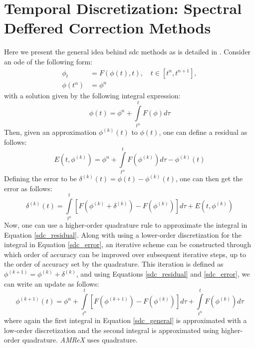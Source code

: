 \section{Temporal Discretization: Spectral Deffered Correction Methods}
Here we present the general idea behind \gls{sdc} methods as is detailed in \cite{MISDC_general}. Consider an \gls{ode} of the following form: 
\begin{equation} \label{toy_ode}
\begin{split}
\phi_t &= F(\phi(t), t), \quad t \in [t^n, t^{n+1}], \\
\phi(t^n) &= \phi^n 
\end{split}
\end{equation}
with a solution given by the following integral expression:
\begin{equation}
\phi(t) = \phi^n + \int\limits_{t^n}^{t} F(\phi) d\tau
\end{equation}
Then, given an approximation $\phi^{(k)}(t)$ to $\phi(t)$, one can define a residual as follows:
\begin{equation} \label{sdc_residual}
E(t, \phi^{(k)}) = \phi^n + \int\limits_{t^n}^t  F(\phi^{(k)}) d\tau - \phi^{(k)}(t)
\end{equation}
Defining the error to be $\delta^{(k)}(t) = \phi(t) - \phi^{(k)}(t)$, one can then get the error as follows:
\begin{equation} \label{sdc_error}
\delta^{(k)}(t) = \int\limits_{t^n}^{t} \left[ F(\phi^{(k)} + \delta^{(k)}) - F(\phi^{(k)}) \right] d\tau + E(t, \phi^{(k)})
\end{equation}
Now, one can use a higher-order quadrature rule to approximate the integral in Equation \ref{sdc_residual}. Along with using a lower-order discretization for the integral in Equation \ref{sdc_error}, an iterative scheme can be constructed through which order of accuracy can be improved over subsequent iterative steps, up to the order of accuracy set by the quadrature. This iteration is defined as $\phi^{(k+1)} = \phi^{(k)} + \delta^{(k)}$, and using Equations \ref{sdc_residual} and \ref{sdc_error}, we can write an update as follows:
\begin{equation} \label{sdc_general}
\phi^{(k+1)}(t) = \phi^n + \int\limits_{t^n}^{t} \left[ F(\phi^{(k+1)}) - F(\phi^{(k)}) \right] d\tau + \int\limits_{t^n}^{t}F(\phi^{(k)}) d\tau
\end{equation}
where again the first integral in Equation \ref{sdc_general} is approximated with a low-order discretization and the second integral is approximated using higher-order quadrature. \textit{AMReX} uses quadrature. 

